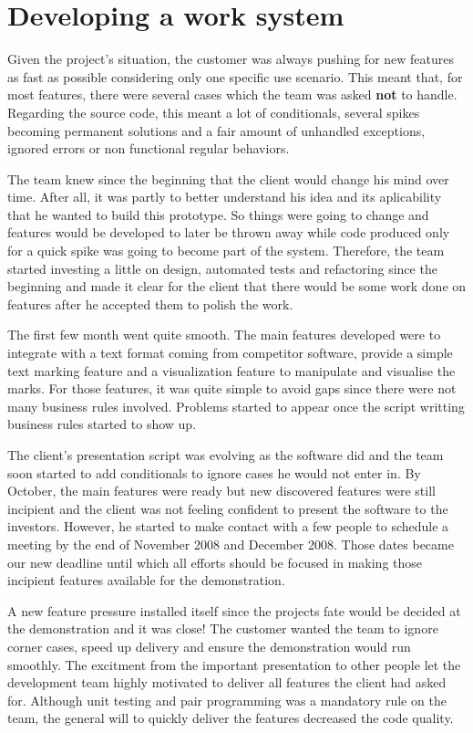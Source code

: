 \documentclass[lnbip]{svmultln}
\begin{document}
\section{Developing a work system}
\label{sec:working}

Given the project's situation, the customer was always pushing for new
features as fast as possible considering only one specific use
scenario. This meant that, for most features, there were several cases
which the team was asked \textbf{not} to handle. Regarding the source
code, this meant a lot of conditionals, several spikes becoming
permanent solutions and a fair amount of unhandled exceptions, ignored
errors or non functional regular behaviors.

The team knew since the beginning that the client would change his
mind over time. After all, it was partly to better understand his idea
and its aplicability that he wanted to build this prototype. So things
were going to change and features would be developed to later be
thrown away while code produced only for a quick spike was going to
become part of the system. Therefore, the team started investing a
little on design, automated tests and refactoring since the beginning
and made it clear for the client that there would be some work done on
features after he accepted them to polish the work.

The first few month went quite smooth. The main features developed
were to integrate with a text format coming from competitor software,
provide a simple text marking feature and a visualization feature to
manipulate and visualise the marks. For those features, it was quite
simple to avoid gaps since there were not many business rules
involved. Problems started to appear once the script writting business
rules started to show up.

The client's presentation script was evolving as the software did and
the team soon started to add conditionals to ignore cases he would not
enter in. By October, the main features were ready but new discovered
features were still incipient and the client was not feeling confident
to present the software to the investors. However, he started to make
contact with a few people to schedule a meeting by the end of November
2008 and December 2008. Those dates became our new deadline until
which all efforts should be focused in making those incipient features
available for the demonstration.

A new feature pressure installed itself since the projects fate would
be decided at the demonstration and it was close! The customer wanted
the team to ignore corner cases, speed up delivery and ensure the
demonstration would run smoothly. The excitment from the important
presentation to other people let the development team highly motivated
to deliver all features the client had asked for. Although unit
testing and pair programming was a mandatory rule on the team, the
general will to quickly deliver the features decreased the code
quality.
\end{document}
